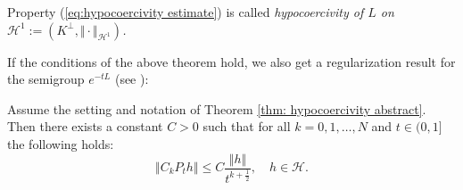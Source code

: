 \begin{remark}
	Property (\ref{eq:hypocoercivity estimate}) is called \emph{hypocoercivity
		of $L$ on $\mathcal{H}^{1}:=(K^{\perp},\Vert\cdot\Vert_{\mathcal{H}^{1}})$.}
\end{remark}
If the conditions of the above theorem hold, we also get a regularization
result for the semigroup $e^{-tL}$ (see  \cite[Theorem A.12]{villani2009hypocoercivity}):
\begin{theorem}
	\label{thm:hypocoercive regularisation}Assume the setting and notation
	of Theorem \ref{thm: hypocoercivity abstract}. Then there exists
	a constant $C>0$ such that for all $k=0,1,\ldots,N$ and $t \in (0,1]$ the following
	holds:
	\[
	\Vert C_{k}P_{t}h\Vert\le C\frac{\Vert h\Vert}{t^{k+\frac{1}{2}}},\quad h\in\mathcal{H}.
	\]
\end{theorem}
